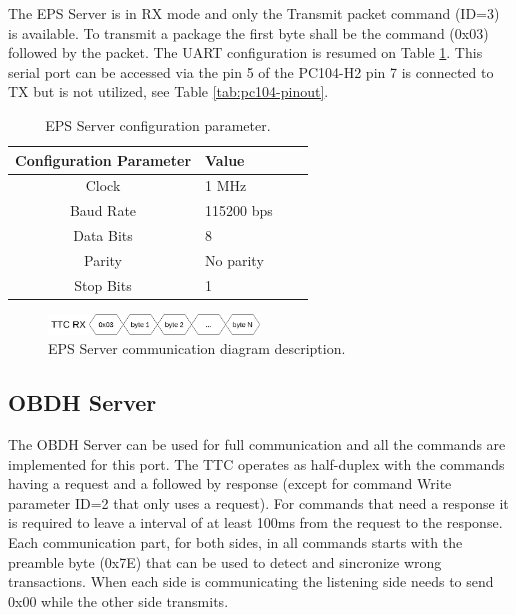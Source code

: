 The EPS Server is in RX mode and only the Transmit packet command (ID=3) is available. To transmit a package the first byte shall be the command (0x03) followed by the packet. The UART configuration is resumed on Table \ref{tab:eps_config}. This serial port can be accessed via the pin 5 of the PC104-H2 pin 7 is connected to TX but is not utilized, see Table \ref{tab:pc104-pinout}.

\begin{table}[!ht]
    \centering
    \begin{tabular}{clll}
        \toprule[1.5pt]
        \textbf{Configuration Parameter} & \textbf{Value}\\
        \midrule
        Clock               & 1 MHz       \\
        Baud Rate           & 115200 bps  \\
        Data Bits           & 8           \\
        Parity              & No parity   \\
        Stop Bits           & 1           \\
        \bottomrule[1.5pt]
    \end{tabular}
    \caption{EPS Server configuration parameter.}
    \label{tab:eps_config}
\end{table}

\begin{figure}[!ht]
    \begin{center}
        \includegraphics[width=0.5\textwidth]{figures/eps_communication.drawio.png}
        \caption{EPS Server communication diagram description.}
        \label{fig:eps-server-communication}
    \end{center}
\end{figure}

\subsection{OBDH Server}

The OBDH Server can be used for full communication and all the commands are implemented for this port. The TTC operates as half-duplex with the commands having a request and a followed by response (except for command Write parameter ID=2 that only uses a request). For commands that need a response it is required to leave a interval of at least 100ms from the request to the response. Each communication part, for both sides, in all commands starts with the preamble byte (0x7E) that can be used to detect and sincronize wrong transactions. When each side is communicating the listening side needs to send 0x00 while the other side transmits.

